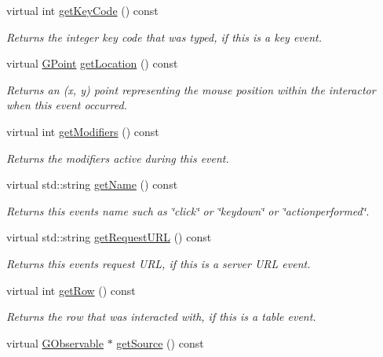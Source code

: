 \begin{DoxyCompactItemize}
virtual int \mbox{\hyperlink{classsgl_1_1GEvent_a71429f4b3c8f3c5097fe39e50501bbb6}{get\+Key\+Code}} () const
\begin{DoxyCompactList}\small\item\em Returns the integer key code that was typed, if this is a key event. \end{DoxyCompactList}\item 
virtual \mbox{\hyperlink{structsgl_1_1GPoint}{G\+Point}} \mbox{\hyperlink{classsgl_1_1GEvent_a4f83802015511edeb63b892830812c11}{get\+Location}} () const
\begin{DoxyCompactList}\small\item\em Returns an (x, y) point representing the mouse position within the interactor when this event occurred. \end{DoxyCompactList}\item 
virtual int \mbox{\hyperlink{classsgl_1_1GEvent_ab8f99a1ccd9832faabeee792bc5702e2}{get\+Modifiers}} () const
\begin{DoxyCompactList}\small\item\em Returns the modifiers active during this event. \end{DoxyCompactList}\item 
virtual std\+::string \mbox{\hyperlink{classsgl_1_1GEvent_a8a60438a5b55d0b2ceb35c8674b9d8c5}{get\+Name}} () const
\begin{DoxyCompactList}\small\item\em Returns this event\textquotesingle{}s name such as \char`\"{}click\char`\"{} or \char`\"{}keydown\char`\"{} or \char`\"{}actionperformed\char`\"{}. \end{DoxyCompactList}\item 
virtual std\+::string \mbox{\hyperlink{classsgl_1_1GEvent_add17fc1a534941f382f2fc7970269138}{get\+Request\+U\+RL}} () const
\begin{DoxyCompactList}\small\item\em Returns this event\textquotesingle{}s request U\+RL, if this is a server U\+RL event. \end{DoxyCompactList}\item 
virtual int \mbox{\hyperlink{classsgl_1_1GEvent_aa7d942808111bd8f4a3ec1cfcf33c6af}{get\+Row}} () const
\begin{DoxyCompactList}\small\item\em Returns the row that was interacted with, if this is a table event. \end{DoxyCompactList}\item 
virtual \mbox{\hyperlink{classsgl_1_1GObservable}{G\+Observable}} $\ast$ \mbox{\hyperlink{classsgl_1_1GEvent_a6a534b750e8678439ebfbeda4b2e4b26}{get\+Source}} () const

\end{DoxyCompactItemize}
